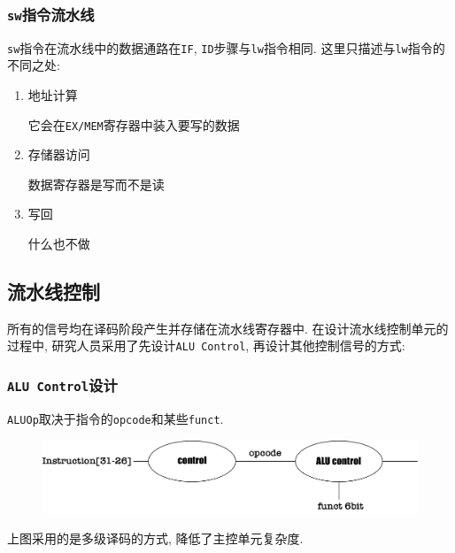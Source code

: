 \subsubsection{\texttt{sw}指令流水线}
\verb|sw|指令在流水线中的数据通路在\verb|IF|, \verb|ID|步骤与\verb|lw|指令相同. 这里只描述与\verb|lw|指令的不同之处:
\begin{enumerate}
\item {\kaishu 地址计算} \par 它会在\verb|EX/MEM|寄存器中装入要写的数据
\item {\kaishu 存储器访问} \par 数据寄存器是写而不是读
\item {\kaishu 写回} \par 什么也不做
\end{enumerate}
\subsection{流水线控制}
所有的信号均在译码阶段产生并存储在流水线寄存器中. 在设计流水线控制单元的过程中, 研究人员采用了先设计\verb|ALU Control|, 再设计其他控制信号的方式:
\subsubsection{\texttt{ALU Control}设计}
\verb|ALUOp|取决于指令的\verb|opcode|和某些\verb|funct|.
\begin{figure}[H]
\centering
\includegraphics[scale=.5]{img/figure52.pdf}
\end{figure}
上图采用的是多级译码的方式, 降低了主控单元复杂度.
